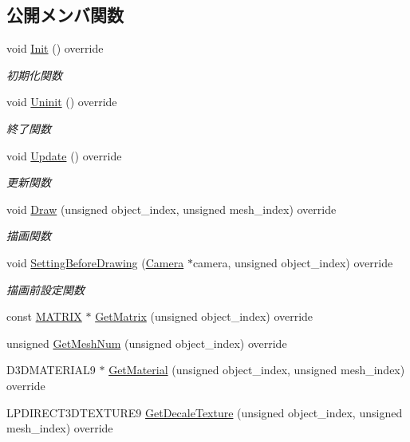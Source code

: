 \subsection*{公開メンバ関数}
\begin{DoxyCompactItemize}
\item 
void \mbox{\hyperlink{class_coin_draw_ad0f5da5cfb896541fd59b1ab4a8593d1}{Init}} () override
\begin{DoxyCompactList}\small\item\em 初期化関数 \end{DoxyCompactList}\item 
void \mbox{\hyperlink{class_coin_draw_a6484c22a5598e298f18e7cd6083cd551}{Uninit}} () override
\begin{DoxyCompactList}\small\item\em 終了関数 \end{DoxyCompactList}\item 
void \mbox{\hyperlink{class_coin_draw_a6157b17bf1706b85156aad0d88acfd7e}{Update}} () override
\begin{DoxyCompactList}\small\item\em 更新関数 \end{DoxyCompactList}\item 
void \mbox{\hyperlink{class_coin_draw_ac7d91fecb6845cebe276eb81a4953563}{Draw}} (unsigned object\+\_\+index, unsigned mesh\+\_\+index) override
\begin{DoxyCompactList}\small\item\em 描画関数 \end{DoxyCompactList}\item 
void \mbox{\hyperlink{class_coin_draw_a66c03acd675ac1820977cb21015abfdb}{Setting\+Before\+Drawing}} (\mbox{\hyperlink{class_camera}{Camera}} $\ast$camera, unsigned object\+\_\+index) override
\begin{DoxyCompactList}\small\item\em 描画前設定関数 \end{DoxyCompactList}\item 
const \mbox{\hyperlink{_vector3_d_8h_a032295cd9fb1b711757c90667278e744}{M\+A\+T\+R\+IX}} $\ast$ \mbox{\hyperlink{class_coin_draw_a8f5fd8668a4c66fe31446cc6f7c4afd7}{Get\+Matrix}} (unsigned object\+\_\+index) override
\item 
unsigned \mbox{\hyperlink{class_coin_draw_a178c8d88effe55aaad7d0e45b02e0566}{Get\+Mesh\+Num}} (unsigned object\+\_\+index) override
\item 
D3\+D\+M\+A\+T\+E\+R\+I\+A\+L9 $\ast$ \mbox{\hyperlink{class_coin_draw_a869a6b7273b273048dd56822fae4d644}{Get\+Material}} (unsigned object\+\_\+index, unsigned mesh\+\_\+index) override
\item 
L\+P\+D\+I\+R\+E\+C\+T3\+D\+T\+E\+X\+T\+U\+R\+E9 \mbox{\hyperlink{class_coin_draw_a1d4ab1a5c480833b8d8e7fe226136ad5}{Get\+Decale\+Texture}} (unsigned object\+\_\+index, unsigned mesh\+\_\+index) override
\end{DoxyCompactItemize}
